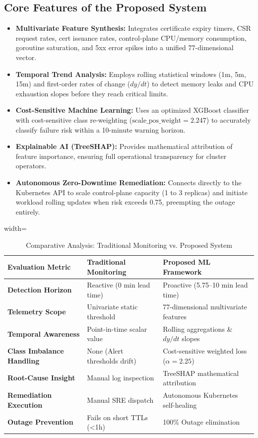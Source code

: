 \documentclass[12pt,a4paper]{report}
\begin{document}
\subsection*{Core Features of the Proposed System}
\begin{itemize}
    \item \textbf{Multivariate Feature Synthesis:} Integrates certificate expiry timers, CSR request rates, cert issuance rates, control-plane CPU/memory consumption, goroutine saturation, and 5xx error spikes into a unified 77-dimensional vector.
    \item \textbf{Temporal Trend Analysis:} Employs rolling statistical windows (1m, 5m, 15m) and first-order rates of change ($dy/dt$) to detect memory leaks and CPU exhaustion slopes before they reach critical limits.
    \item \textbf{Cost-Sensitive Machine Learning:} Uses an optimized XGBoost classifier with cost-sensitive class re-weighting ($\text{scale\_pos\_weight} = 2.247$) to accurately classify failure risk within a 10-minute warning horizon.
    \item \textbf{Explainable AI (TreeSHAP):} Provides mathematical attribution of feature importance, ensuring full operational transparency for cluster operators.
    \item \textbf{Autonomous Zero-Downtime Remediation:} Connects directly to the Kubernetes API to scale control-plane capacity (1 to 3 replicas) and initiate workload rolling updates when risk exceeds 0.75, preempting the outage entirely.
\end{itemize}

\begin{table}[h]
\centering
\caption{Comparative Analysis: Traditional Monitoring vs. Proposed System}
\label{tab:comparative_analysis}
\vspace{0.3cm}
\begin{adjustbox}{width=\textwidth}
\begin{tabular}{p{4.2cm}p{5.5cm}p{5.5cm}}
\toprule
\textbf{Evaluation Metric} & \textbf{Traditional Monitoring} & \textbf{Proposed ML Framework} \\
\midrule
\textbf{Detection Horizon} & Reactive (0 min lead time) & Proactive (5.75--10 min lead time) \\
\textbf{Telemetry Scope} & Univariate static threshold & 77-dimensional multivariate features \\
\textbf{Temporal Awareness} & Point-in-time scalar value & Rolling aggregations \& $dy/dt$ slopes \\
\textbf{Class Imbalance Handling} & None (Alert thresholds drift) & Cost-sensitive weighted loss ($\alpha=2.25$) \\
\textbf{Root-Cause Insight} & Manual log inspection & TreeSHAP mathematical attribution \\
\textbf{Remediation Execution} & Manual SRE dispatch & Autonomous Kubernetes self-healing \\
\textbf{Outage Prevention} & Fails on short TTLs (<1h) & 100\% Outage elimination \\
\bottomrule
\end{tabular}
\end{adjustbox}
\end{table}
\end{document}
